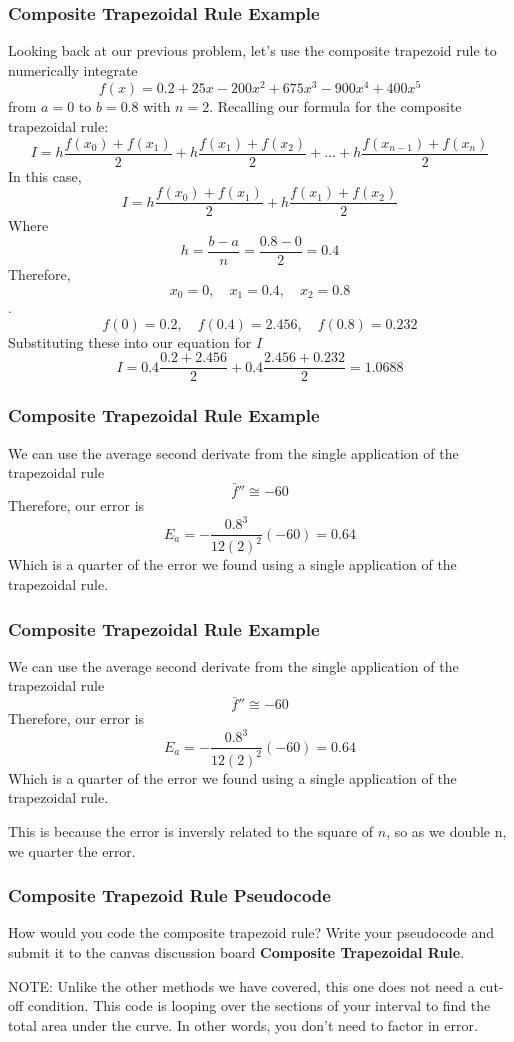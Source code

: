 \documentclass{if-beamer}
\begin{document}
\begin{frame}
	\frametitle{Composite Trapezoidal Rule Example}
	Looking back at our previous problem, let's use the composite trapezoid rule to numerically integrate
	$$f(x) =0.2+25x-200x^2+675x^3-900x^4+400x^5$$
	from $a = 0$ to $b=0.8$ with $n = 2$. Recalling our formula for the composite trapezoidal rule:
	$$I = h\frac{f(x_0)+f(x_1)}{2}+h\frac{f(x_1)+f(x_2)}{2}+...+h\frac{f(x_{n-1})+f(x_n)}{2}$$
	In this case, 
	$$I = h\frac{f(x_0)+f(x_1)}{2}+h\frac{f(x_1)+f(x_2)}{2}$$
	Where 
	$$h = \frac{b-a}{n} = \frac{0.8-0}{2} = 0.4$$
	Therefore,
	$$ x_0 = 0, \quad x_1 = 0.4, \quad x_2 = 0.8$$.
	$$f(0) = 0.2, \quad f(0.4) = 2.456, \quad f(0.8) = 0.232$$
	Substituting these into our equation for $I$
	$$ I = 0.4\frac{0.2+2.456}{2}+0.4\frac{2.456+0.232}{2} = 1.0688$$
\end{frame}

\begin{frame}
	\frametitle{Composite Trapezoidal Rule Example}
	We can use the average second derivate from the single application of the trapezoidal rule
	$$\bar{f}''\cong -60 $$
	Therefore, our error is 
	$$E_a = -\frac{0.8^3}{12(2)^2}(-60) =0.64$$
	Which is a quarter of the error we found using a single application of the trapezoidal rule.
\end{frame}

\begin{frame}
	\frametitle{Composite Trapezoidal Rule Example}
	We can use the average second derivate from the single application of the trapezoidal rule
	$$\bar{f}''\cong -60 $$
	Therefore, our error is 
	$$E_a = -\frac{0.8^3}{12(2)^2}(-60) =0.64$$
	Which is a quarter of the error we found using a single application of the trapezoidal rule. \\\vspace{10pt}
	
	This is because the error is inversly related to the square of $n$, so as we double n, we quarter the error.
\end{frame}

\begin{frame}
	\frametitle{Composite Trapezoid Rule Pseudocode}
	How would you code the composite trapezoid rule? Write your pseudocode and submit it to the canvas discussion board \textbf{Composite Trapezoidal Rule}. \\\vspace{10pt}
	
	NOTE: Unlike the other methods we have covered, this one does not need a cut-off condition. This code is looping over the sections of your interval to find the total area under the curve. In other words, you don't need to factor in error.
\end{frame}	
\end{document}
